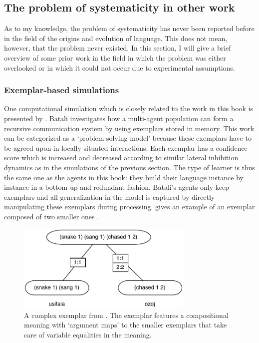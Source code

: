 \subsection{The problem of systematicity in other work}
\label{s:problem-systematicity}

As to my knowledge, the problem of systematicity has never been reported before in the field of the origins and evolution of language. This does not mean, however, that the problem never existed. In this section, I will give a brief overview of some prior work in the field in which the problem was either overlooked or in which it could not occur due to experimental assumptions.


\subsubsection{Exemplar-based simulations}
 One computational simulation which is closely related to the work in this book is presented by \citet{batali02negotiation}. Batali investigates how a multi-agent population can form a recursive communication system by using exemplars stored in memory. This work can be categorized as a `problem-solving model' because these exemplars have to be agreed upon in locally situated interactions. Each exemplar has a confidence score which is increased and decreased according to similar lateral inhibition dynamics as in the simulations of the previous section. The type of learner is thus the same one as the agents in this book: they build their language instance by instance in a bottom-up and redundant fashion. Batali's agents only keep exemplars and all generalization in the model is captured by directly manipulating these exemplars during processing.  gives an example of an exemplar composed of two smaller ones \citep[exemplar 5.1.2.a]{batali02negotiation}.

\begin{figure} 
\centerline{\includegraphics[width=0.75\textwidth]{Chapter4/figs/batali}}
  \caption[An exemplar \citep{batali02negotiation}]{A complex exemplar from \citet{batali02negotiation}. The exemplar features a compositional meaning with `argument maps' to the smaller exemplars that take care of variable equalities in the meaning.}
   \label{f:batali}
\end{figure}

